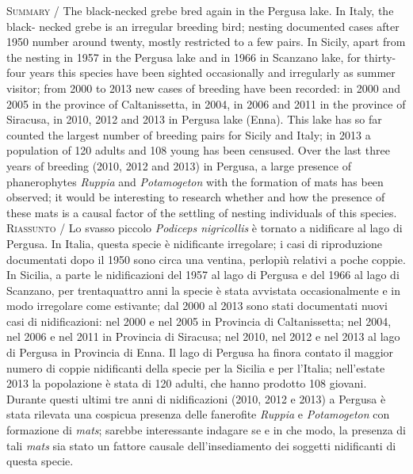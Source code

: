 {\small
\noindent \textsc{\textcolor{MUSEBLUE}{Summary}} / The black-necked grebe bred again in the Pergusa lake.
In Italy, the black- necked grebe is an irregular breeding bird;
nesting documented cases after 1950 number around twenty, mostly
restricted to a few pairs. In Sicily, apart from the nesting in 1957 in
the Pergusa lake and in 1966 in Scanzano lake, for thirty-four years
this species have been sighted occasionally and irregularly as summer
visitor; from 2000 to 2013 new cases of breeding have been recorded: in
2000 and 2005 in the province of Caltanissetta, in 2004, in 2006 and
2011 in the province of Siracusa, in 2010, 2012 and 2013 in Pergusa
lake (Enna). This lake has so far counted the largest number of
breeding pairs for Sicily and Italy; in 2013 a population of 120 adults
and 108 young has been censused. Over the last three years of breeding
(2010, 2012 and 2013) in Pergusa, a large presence of phanerophytes
\textit{Ruppia} and \textit{Potamogeton} with the
 formation of mats has been observed; it would be
interesting to research whether and how the presence of these mats is a
causal factor of the settling of nesting individuals of this species. \\
\noindent \textsc{\color{MUSEBLUE} Riassunto} / Lo svasso piccolo \textit{Podiceps nigricollis} \`e tornato a nidificare
al lago di Pergusa. In Italia, questa specie \`e nidificante
irregolare; i casi di riproduzione documentati dopo il 1950 sono circa
una ventina, perlopi\`u relativi a poche coppie. In Sicilia, a parte le
nidificazioni del 1957 al lago di Pergusa e del 1966 al lago di
Scanzano, per trentaquattro anni la specie \`e stata avvistata
occasionalmente e in modo irregolare come estivante; dal 2000 al 2013
sono stati documentati nuovi casi di nidificazioni: nel 2000 e nel 2005
in Provincia di Caltanissetta; nel 2004, nel 2006 e nel 2011 in
Provincia di Siracusa; nel 2010, nel 2012 e nel 2013 al lago di Pergusa
in Provincia di Enna. {Il lago di Pergusa }ha finora
contato il maggior numero di coppie nidificanti della specie per la
Sicilia e per l{\textquoteright}Italia; nell{\textquoteright}estate
2013 la popolazione \`e stata di 120 adulti, che hanno prodotto 108
giovani. Durante questi ultimi tre anni di nidificazioni (2010, 2012 e
2013) a Pergusa \`e stata rilevata una cospicua presenza delle
fanerofite \textit{Ruppia} e \textit{Potamogeton} con formazione di
\textit{mats}; sarebbe interessante indagare se e in che modo, la
presenza di tali \textit{mats} sia stato un fattore causale
dell{\textquoteright}insediamento dei soggetti nidificanti di questa
specie.
}




